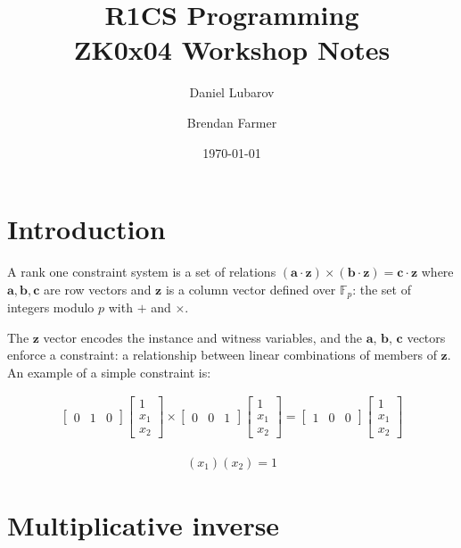 \documentclass{article}
\title{R1CS Programming \\ \large ZK0x04 Workshop Notes}
\author{Daniel Lubarov \and Brendan Farmer}
\date{\today}
\renewcommand{\vec}[1]{\mathbf{#1}}
\begin{document}
\maketitle

{\hypersetup{hidelinks} \tableofcontents}
\newpage

\section{Introduction}

A rank one constraint system is a set of relations $(\vec{a}\cdot \vec{z})\times(\vec{b} \cdot \vec{z}) = \vec{c}\cdot \vec{z}$ where $\vec{a}, \vec{b}, \vec{c}$ are row vectors and $\vec{z}$ is a column vector defined over $\mathbb{F}_p$: the set of integers modulo $p$ with $+$ and $\times$. 

The $\vec{z}$ vector encodes the instance and witness variables, and the $\vec{a}$, $\vec{b}$, $\vec{c}$ vectors enforce a constraint: a relationship between linear combinations of members of $\vec{z}$. An example of a simple constraint is:

  \begin{align}
      \begin{bmatrix}
	  0 & 1 & 0
	\end{bmatrix}
    \begin{bmatrix}
	  1 \\
	  x_{1} \\
	  x_{2}
	\end{bmatrix}
	\times
	 \begin{bmatrix}
	  0 & 0 & 1
	\end{bmatrix}
    \begin{bmatrix}
	  1 \\
	  x_{1} \\
	  x_{2}
	\end{bmatrix}
	=
	\begin{bmatrix}
	  1 & 0 & 0
	\end{bmatrix}
    \begin{bmatrix}
	  1 \\
	  x_{1} \\
	  x_{2}
	\end{bmatrix}
  \end{align}
  
  \begin{align}
	(x_{1}) (x_{2}) = 1
  \end{align}

\section{Multiplicative inverse} \label{sec:inverse}
\end{document}
